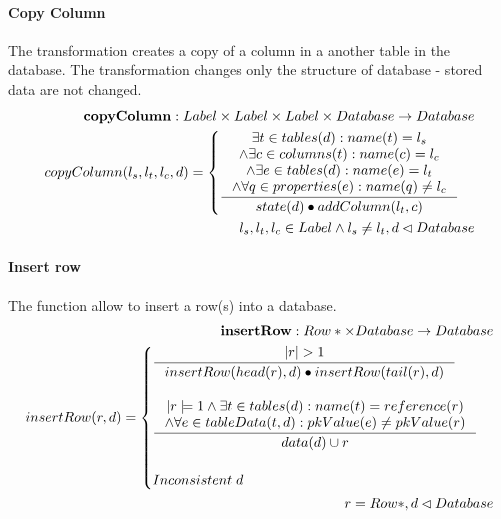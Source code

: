 \documentclass[11pt]{article}
\begin{document}
\paragraph{Copy Column} The transformation creates a copy of a column in a another table in the database. The transformation changes only the structure of database - stored data are not changed.
\begin{align*}
	\mathbf{copyColumn} : Label \times Label \times Label \times Database \rightarrow Database \\
	copyColumn(l_s, l_t, l_c, d) = \begin{cases}
 		\inference{\exists t \in tables(d) : name(t) = l_s \\ \wedge \exists c \in columns(t) : name(c) = l_c \\ \wedge \exists e \in tables(d) : name(e) = l_t  \\ \wedge \forall q \in properties(e) : name(q) \neq l_c}{state(d) \bullet addColumn(l_t, c)} 
	\end{cases} \\
	l_s,l_t,l_c \in Label \wedge l_s \neq l_t,d \lhd Database
\end{align*}

\paragraph{Insert row} The function allow to insert a row(s) into a database.
\begin{align*}
	\mathbf{insertRow} : Row* \times Database \rightarrow Database \\
	insertRow(r, d) = \begin{cases}
			\inference{|r|>1}{insertRow(head(r), d) \bullet insertRow(tail(r), d)} \\ \\
		 	\inference{|r|=1 \wedge \exists t \in tables(d) : name(t) = reference(r) \\ \wedge \forall e \in tableData(t, d) : pkValue(e) \neq pkValue(r)}{data(d) \cup r} \\ \\
			 Inconsistent \; d
		 \end{cases}	\\
		 r = Row*,d \lhd Database
\end{align*}
\end{document}
